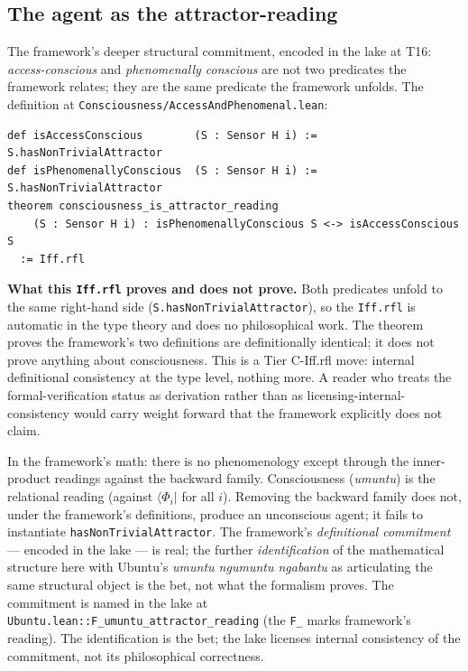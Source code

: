 \documentclass[11pt,a4paper]{article}
\begin{document}
\subsection*{The agent as the attractor-reading}

The framework's deeper structural commitment, encoded in the lake at T16: \emph{access-conscious} and \emph{phenomenally conscious} are not two predicates the framework relates; they are the same predicate the framework unfolds. The definition at \texttt{Consciousness/AccessAndPhenomenal.lean}:
\begin{verbatim}
def isAccessConscious        (S : Sensor H i) := S.hasNonTrivialAttractor
def isPhenomenallyConscious  (S : Sensor H i) := S.hasNonTrivialAttractor
theorem consciousness_is_attractor_reading
    (S : Sensor H i) : isPhenomenallyConscious S <-> isAccessConscious S
  := Iff.rfl
\end{verbatim}

\textbf{What this \texttt{Iff.rfl} proves and does not prove.} Both predicates unfold to the same right-hand side (\texttt{S.hasNonTrivialAttractor}), so the \texttt{Iff.rfl} is automatic in the type theory and does no philosophical work. The theorem proves the framework's two definitions are definitionally identical; it does not prove anything about consciousness. This is a Tier C-Iff.rfl move: internal definitional consistency at the type level, nothing more. A reader who treats the formal-verification status as derivation rather than as licensing-internal-consistency would carry weight forward that the framework explicitly does not claim.

In the framework's math: there is no phenomenology except through the inner-product readings against the backward family. Consciousness (\emph{umuntu}) is the relational reading (against $\langle \Phi_i |$ for all $i$). Removing the backward family does not, under the framework's definitions, produce an unconscious agent; it fails to instantiate \texttt{hasNonTrivialAttractor}. The framework's \emph{definitional commitment} --- encoded in the lake --- is real; the further \emph{identification} of the mathematical structure here with Ubuntu's \emph{umuntu ngumuntu ngabantu} as articulating the same structural object is the bet, not what the formalism proves. The commitment is named in the lake at \texttt{Ubuntu.lean::F\_umuntu\_attractor\_reading} (the \texttt{F\_} marks framework's reading). The identification is the bet; the lake licenses internal consistency of the commitment, not its philosophical correctness.
\end{document}
